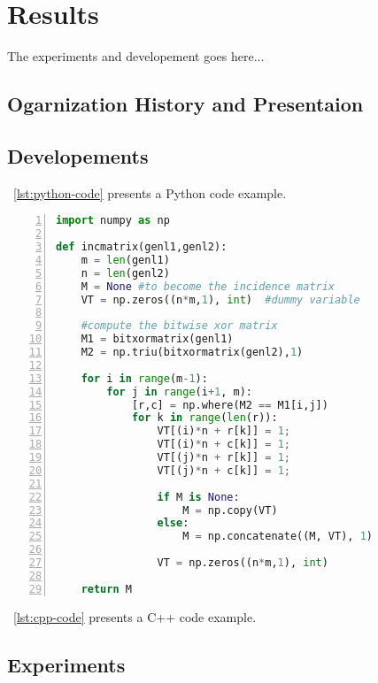 \chapter{Results}\label{chap:Results}

The experiments and developement goes here...

\section{Ogarnization History and Presentaion}


\section{Developements} \label{sec:dev}


\lstlistingname~\ref{lst:python-code} presents a Python code example.

\begin{lstlisting}[numbers=left, language=Python, style=mycode, caption={Python code example.}, label={lst:python-code}]
import numpy as np
 
def incmatrix(genl1,genl2):
    m = len(genl1)
    n = len(genl2)
    M = None #to become the incidence matrix
    VT = np.zeros((n*m,1), int)  #dummy variable
 
    #compute the bitwise xor matrix
    M1 = bitxormatrix(genl1)
    M2 = np.triu(bitxormatrix(genl2),1) 
 
    for i in range(m-1):
        for j in range(i+1, m):
            [r,c] = np.where(M2 == M1[i,j])
            for k in range(len(r)):
                VT[(i)*n + r[k]] = 1;
                VT[(i)*n + c[k]] = 1;
                VT[(j)*n + r[k]] = 1;
                VT[(j)*n + c[k]] = 1;
 
                if M is None:
                    M = np.copy(VT)
                else:
                    M = np.concatenate((M, VT), 1)
 
                VT = np.zeros((n*m,1), int)
 
    return M
\end{lstlisting}

\lstlistingname~\ref{lst:cpp-code} presents a C++ code example.




\section{Experiments} \label{sec:exp}



